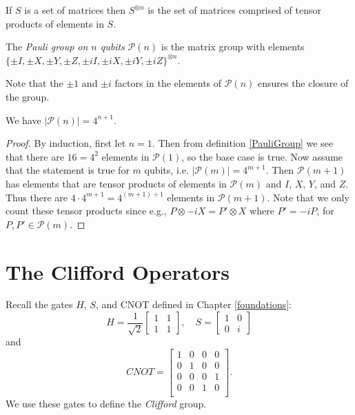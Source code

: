 \documentclass[12pt]{dalthesis}
\begin{document}
If $S$ is a set of matrices then $S^{\otimes n}$ is the set of matrices comprised of tensor products of elements in $S$.

\begin{definition}
\label{PauliGroup}
The \emph{Pauli group on $n$ qubits} $\mathcal{P}(n)$ is the matrix group with elements $\{ \pm I, \pm X, \pm Y, \pm Z, \pm iI, \pm iX, \pm iY, \pm iZ \}^{\otimes n}$.
\end{definition}

Note that the $\pm 1$ and $\pm i$ factors in the elements of $\mathcal{P}(n)$ ensures the closure of the group.


\begin{proposition}
We have $|\mathcal{P}(n)|=4^{n+1}$.
\end{proposition}

\begin{proof}
By induction, first let $n=1$. Then from definition \ref{PauliGroup} we see that there are $16 = 4^2$ elements in $\mathcal{P}(1)$, so the base case is true. Now assume that the statement is true for $m$ qubits, i.e. $|\mathcal{P}(m)| = 4^{m+1}$. Then $\mathcal{P}(m+1)$ has elements that are tensor products of elements in $\mathcal{P}(m)$ and $I$, $X$, $Y$, and $Z$. Thus there are $4 \cdot 4^{m+1} = 4^{(m+1)+1}$ elements in $\mathcal{P}(m+1)$. Note that we only count these tensor products since e.g., $P \otimes -iX = P' \otimes X$ where $P' = -iP$, for $P, P' \in \mathcal{P}(m)$.
\end{proof}

\section{The Clifford Operators}
Recall the gates $H$, $S$, and CNOT defined in Chapter \ref{foundations}:
  \[
  H = \frac{1}{\sqrt{2}} \begin{bmatrix}
  1 & 1 \\
  1 & 1
  \end{bmatrix}, \quad
  S = \begin{bmatrix}
  1 & 0 \\
  0 & i
  \end{bmatrix}
  \]
and 
  \[
  CNOT = \begin{bmatrix}
  1 & 0 & 0 & 0 \\
  0 & 1 & 0 & 0 \\
  0 & 0 & 0 & 1 \\
  0 & 0 & 1 & 0 \\
  \end{bmatrix}.
  \]
We use these gates to define the \emph{Clifford} group.
\end{document}
